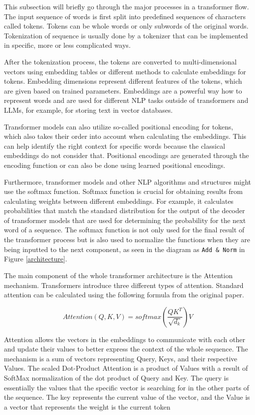 
This subsection will briefly go through the major processes in a transformer flow. The input sequence of words is first split into predefined sequences of characters called tokens. Tokens can be whole words or only subwords of the original words. Tokenization of sequence is usually done by a tokenizer that can be implemented in specific, more or less complicated ways.

After the tokenization process, the tokens are converted to multi-dimensional vectors using embedding tables or different methods to calculate embeddings for tokens. Embedding dimensions represent different features of the tokens, which are given based on trained parameters. Embeddings are a powerful way how to represent words and are used for different NLP tasks outside of transformers and LLMs, for example, for storing text in vector databases. 

Transformer models can also utilize so-called positional encoding for tokens, which also takes their order into account when calculating the embeddings. This can help identify the right context for specific words because the classical embeddings do not consider that. Positional encodings are generated through the encoding function or can also be done using learned positional encodings.

Furthermore, transformer models and other NLP algorithms and structures might use the softmax function. Softmax function is crucial for obtaining results from calculating weights between different embeddings. For example, it calculates probabilities that match the standard distribution for the output of the decoder of transformer models that are used for determining the probability for the next word of a sequence. The softmax function is not only used for the final result of the transformer process but is also used to normalize the functions when they are being inputted to the next component, as seen in the diagram as \verb|Add & Norm| in Figure \ref{architecture}. 

The main component of the whole transformer architecture is the Attention mechanism. Transformers introduce three different types of attention. Standard attention can be calculated using the following formula from the original paper.

$$Attention(Q, K, V ) = softmax(\frac{QK^T}{\sqrt{d_k}})V$$

Attention allows the vectors in the embeddings to communicate with each other and update their values to better express the context of the whole sequence. The mechanism is a sum of vectors representing Query, Keys, and their respective Values. The scaled Dot-Product Attention is a product of Values with a result of SoftMax normalization of the dot product of Query and Key. The query is essentially the values that the specific vector is searching for in the other parts of the sequence. The key represents the current value of the vector, and the Value is a vector that represents the weight is the current token

